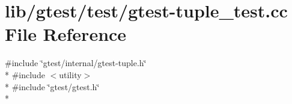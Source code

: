 \hypertarget{gtest-tuple__test_8cc}{\section{lib/gtest/test/gtest-\/tuple\-\_\-test.cc File Reference}
\label{gtest-tuple__test_8cc}
}
{\ttfamily \#include \char`\"{}gtest/internal/gtest-\/tuple.\-h\char`\"{}}\\*
{\ttfamily \#include $<$utility$>$}\\*
{\ttfamily \#include \char`\"{}gtest/gtest.\-h\char`\"{}}\\*
